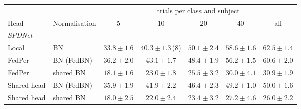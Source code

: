 \begin{tabular}{llccccc}
\toprule
 & & \multicolumn{5}{c}{trials per class and subject} \\
\cmidrule(lr){3-7}
Head & Normalisation & 5 & 10 & 20 & 40 & all \\
\midrule
\multicolumn{7}{l}{\emph{SPDNet}} \\
Local & BN & $33.8 \pm 1.6$ & $40.3 \pm 1.3$\,{\scriptsize (8)} & $\mathbf{50.1} \pm 2.4$ & $\mathbf{58.6} \pm 1.6$ & $\mathbf{62.5} \pm 1.4$ \\
FedPer & BN (FedBN) & $\mathbf{36.2} \pm 2.0$ & $\mathbf{43.1} \pm 1.7$ & $48.4 \pm 1.9$ & $56.2 \pm 1.5$ & $60.6 \pm 2.0$ \\
FedPer & shared BN & $18.1 \pm 1.6$ & $23.0 \pm 1.8$ & $25.5 \pm 3.2$ & $30.0 \pm 4.1$ & $30.9 \pm 1.9$ \\
Shared head & BN (FedBN) & $35.9 \pm 1.9$ & $41.9 \pm 2.2$ & $46.4 \pm 2.3$ & $49.2 \pm 1.0$ & $50.0 \pm 1.6$ \\
Shared head & shared BN & $18.0 \pm 2.5$ & $22.0 \pm 2.4$ & $23.4 \pm 3.2$ & $27.2 \pm 4.6$ & $26.0 \pm 2.2$ \\
\bottomrule
\end{tabular}
